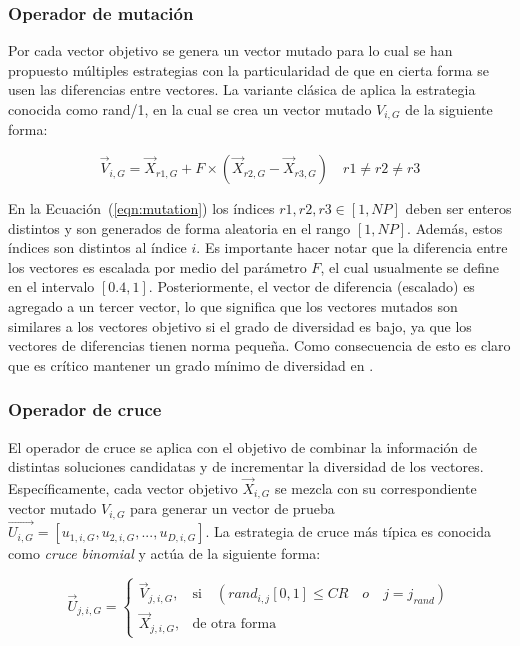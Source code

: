 \subsubsection{Operador de mutación}

Por cada vector objetivo se genera un vector mutado para lo cual se han propuesto múltiples estrategias con la particularidad de que en cierta forma
se usen las diferencias entre vectores.
%
La variante clásica de \DE{} aplica la estrategia conocida como rand/1, en la cual se crea un vector mutado $V_{i,G}$ de la siguiente forma:

\begin{equation}\label{eqn:mutation}
\vec{V}_{i,G} = \vec{X}_{r1, G} + F \times (\vec{X}_{r2, G} - \vec{X}_{r3, G}) \quad r1 \neq r2 \neq r3
\end{equation}

En la Ecuación~(\ref{eqn:mutation}) los índices $r1, r2, r3 \in [1,NP]$ deben ser enteros distintos y son generados de forma aleatoria
en el rango $[1, NP]$.
%
Además, estos índices son distintos al índice $i$.
%
Es importante hacer notar que la diferencia entre los vectores es escalada por medio del parámetro $F$, el cual usualmente se define en el intervalo $[0.4, 1]$.
%
Posteriormente, el vector de diferencia (escalado) es agregado a un tercer vector, lo que significa que
los vectores mutados son similares a los vectores objetivo si el grado de diversidad es bajo, ya que los vectores de diferencias tienen norma pequeña.
%
Como consecuencia de esto es claro que es crítico mantener un grado mínimo de diversidad en \DE{}.

\subsubsection{Operador de cruce}

El operador de cruce se aplica con el objetivo de combinar la información de distintas soluciones candidatas y de incrementar la diversidad de los vectores.
%
Específicamente, cada vector objetivo $\vec{X}_{i,G}$ se mezcla con su correspondiente vector mutado $V_{i,G}$ para generar un vector de 
prueba $\vec{U_{i,G}} = [u_{1,i,G},u_{2,i,G}, ..., u_{D,i,G} ]$.
%
La estrategia de cruce más típica es conocida como \textit{cruce binomial} y actúa de la siguiente forma:

\begin{equation} \label{eqn:crossover}
\vec{U}_{j,i,G}= 
\begin{cases}
    \vec{V}_{j,i,G},& \text{si} \quad (rand_{i,j}[0,1] \leq CR \quad o \quad j = j_{rand}  )\\
    \vec{X}_{j,i,G},              & \text{de otra forma}
\end{cases}
\end{equation}

